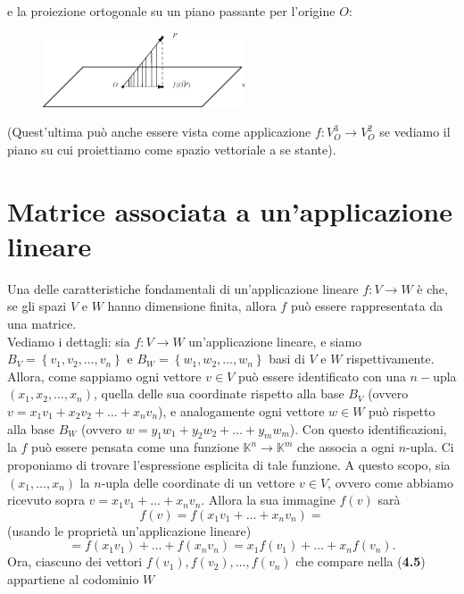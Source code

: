 \begin{definizione}
\begin{esempio}
    e la proiezione ortogonale su un piano passante per l'origine $O$:
    \begin{figure}[th]
      \centering
        \includegraphics[width=6cm]{img/finiti/imgex4-2-10.eps}
    \end{figure}
    (Quest'ultima può anche essere vista come applicazione $f:V_O^3\to V_O^2$ se vediamo il piano su cui
    proiettiamo come spazio vettoriale a se stante).
  \end{esempio}
\end{definizione}

\section{Matrice associata a un'applicazione lineare}
\label{sec:matassaunapplin}
Una delle caratteristiche fondamentali di un'applicazione lineare $f:V\to W$ è che, se gli spazi $V$ e $W$ hanno
dimensione finita, allora $f$ può essere rappresentata da una matrice.\\ Vediamo i dettagli: sia $f:V\to W$
un'applicazione lineare, e siamo $B_V=\left\{v_1,v_2,\dots,v_n\right\}$ e $B_W=\left\{w_1,w_2,\dots,w_n\right\}$
basi di $V$ e $W$ rispettivamente. Allora, come sappiamo ogni vettore $v\in V$ può essere identificato con una
$n-$upla $\left(x_1,x_2,\dots,x_n\right)$, quella delle sua coordinate rispetto alla base $B_V$ (ovvero
$v=x_1v_1+x_2v_2+\dots+x_nv_n$), e analogamente ogni vettore $w\in W$ può rispetto alla base $B_W$ (ovvero
$w=y_1w_1+y_2w_2+\dots+y_mw_m$). Con questo identificazioni, la $f$ può essere pensata come una funzione
$\mathds{K}^n\to\mathds{K}^m$ che associa a ogni $n$-upla. Ci proponiamo di trovare l'espressione esplicita di
tale funzione. A questo scopo, sia $(x_1,\dots,x_n)$ la $n$-upla delle coordinate di un vettore $v\in V$, ovvero
come abbiamo ricevuto sopra $v=x_1v_1+\dots+x_nv_n$. Allora la sua immagine $f(v)$ sarà
\begin{equation*}
  f(v)=f(x_1v_1+\dots+x_nv_n) =
\end{equation*}
(usando le proprietà un'applicazione lineare)
\begin{equation}
  =f(x_1v_1)+\dots+f(x_nv_n)=x_1f(v_1)+\dots+x_nf(v_n).
\end{equation}
Ora, ciascuno dei vettori $f(v_1),f(v_2),\dots,f(v_n)$ che compare nella ({\bf 4.5}) appartiene al codominio $W$

